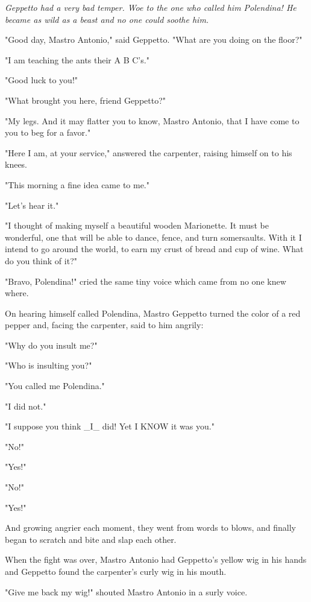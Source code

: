 \documentclass[12pt,twoside,twocolumn]{article}
\begin{document}
\bigskip
{\slshape%
  Geppetto had a very bad temper.  Woe to the one who
  called him Polendina!  He became as wild as a beast and
  no one could soothe him.

  "Good day, Mastro Antonio," said Geppetto.  "What
  are you doing on the floor?"

  "I am teaching the ants their A B C's."

  "Good luck to you!"

  "What brought you here, friend Geppetto?"

  "My legs.  And it may flatter you to know, Mastro
  Antonio, that I have come to you to beg for a favor."

  "Here I am, at your service," answered the carpenter,
  raising himself on to his knees.

  "This morning a fine idea came to me."

  "Let's hear it."

  "I thought of making myself a beautiful wooden
  Marionette.  It must be wonderful, one that will be able to
  dance, fence, and turn somersaults.  With it I intend to go
  around the world, to earn my crust of bread and cup of
  wine.  What do you think of it?"

  "Bravo, Polendina!" cried the same tiny voice which
  came from no one knew where.

  On hearing himself called Polendina, Mastro Geppetto
  turned the color of a red pepper and, facing the carpenter,
  said to him angrily:

  "Why do you insult me?"

  "Who is insulting you?"

  "You called me Polendina."

  "I did not."

  "I suppose you think \_I\_ did!  Yet I KNOW it was you."

  "No!"

  "Yes!"

  "No!"

  "Yes!"

  And growing angrier each moment, they went from
  words to blows, and finally began to scratch and bite and
  slap each other.

  When the fight was over, Mastro Antonio had Geppetto's
  yellow wig in his hands and Geppetto found the carpenter's
  curly wig in his mouth.

  "Give me back my wig!" shouted Mastro Antonio in a surly voice.

}
\end{document}

